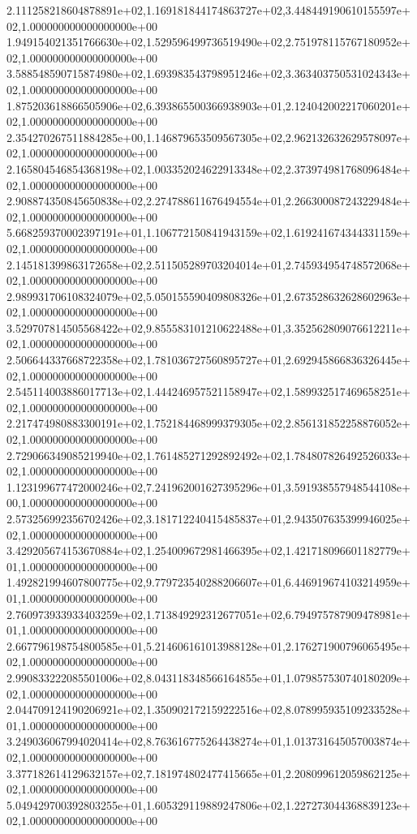2.111258218604878891e+02,1.169181844174863727e+02,3.448449190610155597e+02,1.000000000000000000e+00
1.949154021351766630e+02,1.529596499736519490e+02,2.751978115767180952e+02,1.000000000000000000e+00
3.588548590715874980e+02,1.693983543798951246e+02,3.363403750531024343e+02,1.000000000000000000e+00
1.875203618866505906e+02,6.393865500366938903e+01,2.124042002217060201e+02,1.000000000000000000e+00
2.354270267511884285e+00,1.146879653509567305e+02,2.962132632629578097e+02,1.000000000000000000e+00
2.165804546854368198e+02,1.003352024622913348e+02,2.373974981768096484e+02,1.000000000000000000e+00
2.908874350845650838e+02,2.274788611676494554e+01,2.266300087243229484e+02,1.000000000000000000e+00
5.668259370002397191e+01,1.106772150841943159e+02,1.619241674344331159e+02,1.000000000000000000e+00
2.145181399863172658e+02,2.511505289703204014e+01,2.745934954748572068e+02,1.000000000000000000e+00
2.989931706108324079e+02,5.050155590409808326e+01,2.673528632628602963e+02,1.000000000000000000e+00
3.529707814505568422e+02,9.855583101210622488e+01,3.352562809076612211e+02,1.000000000000000000e+00
2.506644337668722358e+02,1.781036727560895727e+01,2.692945866836326445e+02,1.000000000000000000e+00
2.545114003886017713e+02,1.444246957521158947e+02,1.589932517469658251e+02,1.000000000000000000e+00
2.217474980883300191e+02,1.752184468999379305e+02,2.856131852258876052e+02,1.000000000000000000e+00
2.729066349085219940e+02,1.761485271292892492e+02,1.784807826492526033e+02,1.000000000000000000e+00
1.123199677472000246e+02,7.241962001627395296e+01,3.591938557948544108e+00,1.000000000000000000e+00
2.573256992356702426e+02,3.181712240415485837e+01,2.943507635399946025e+02,1.000000000000000000e+00
3.429205674153670884e+02,1.254009672981466395e+02,1.421718096601182779e+01,1.000000000000000000e+00
1.492821994607800775e+02,9.779723540288206607e+01,6.446919674103214959e+01,1.000000000000000000e+00
2.760973933933403259e+02,1.713849292312677051e+02,6.794975787909478981e+01,1.000000000000000000e+00
2.667796198754800585e+01,5.214606161013988128e+01,2.176271900796065495e+02,1.000000000000000000e+00
2.990833222085501006e+02,8.043118348566164855e+01,1.079857530740180209e+02,1.000000000000000000e+00
2.044709124190206921e+02,1.350902172159222516e+02,8.078995935109233528e+01,1.000000000000000000e+00
3.249036067994020414e+02,8.763616775264438274e+01,1.013731645057003874e+02,1.000000000000000000e+00
3.377182614129632157e+02,7.181974802477415665e+01,2.208099612059862125e+02,1.000000000000000000e+00
5.049429700392803255e+01,1.605329119889247806e+02,1.227273044368839123e+02,1.000000000000000000e+00
